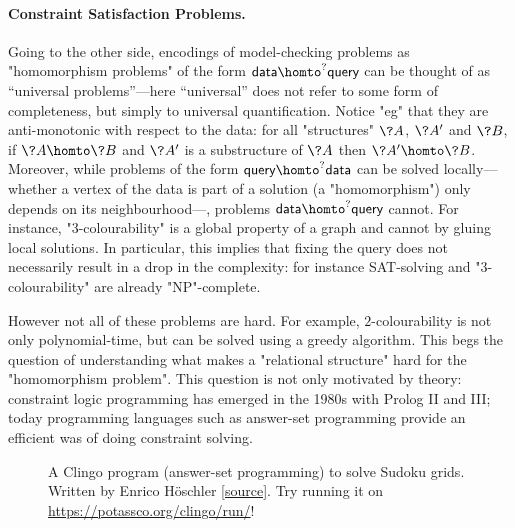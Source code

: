 \paragraph*{Constraint Satisfaction Problems.}
Going to the other side, encodings of model-checking problems
as "homomorphism problems" of the form $\textsf{data} \homto^? \textsf{query}$
can be thought of as ``universal problems''---here ``universal'' does not
refer to some form of completeness, but simply to universal quantification.
Notice "eg" that they are anti-monotonic with respect to the data:
for all "structures" $\?A$, $\?A'$ and $\?B$, if $\?A \homto \?B$ and $\?A'$ is a substructure
of $\?A$ then $\?A' \homto \?B$.
Moreover, while problems of the form $\textsf{query} \homto^? \textsf{data}$
can be solved locally---whether a vertex of the data is part of a solution (a "homomorphism") only 
depends on its neighbourhood---, problems $\textsf{data} \homto^? \textsf{query}$ cannot.
For instance, "3-colourability" is a global property of a graph and cannot by gluing local 
solutions. In particular, this implies that fixing the query does not necessarily result in
a drop in the complexity: for instance SAT-solving and "3-colourability" are already "NP"-complete.

However not all of these problems are hard. For example, $2$-colourability is not only polynomial-time,
but can be solved using a greedy algorithm. This begs the question of understanding what
makes a "relational structure" hard for the "homomorphism problem".
This question is not only motivated by theory: constraint logic programming has emerged in the 1980s
with Prolog II and III; today programming languages such as answer-set programming provide an 
efficient was of doing constraint solving.

\begin{figure}
	\centering
	
	\caption{
		\AP\label{fig:ex-sudoku-asp}
		A Clingo program (answer-set programming) to solve Sudoku grids.
		Written by Enrico Höschler
		\href{https://ddmler.github.io/asp/2018/07/10/answer-set-programming-sudoku-solver.html}{[source]}.
		Try running it on \url{https://potassco.org/clingo/run/}!
	}
\end{figure}

